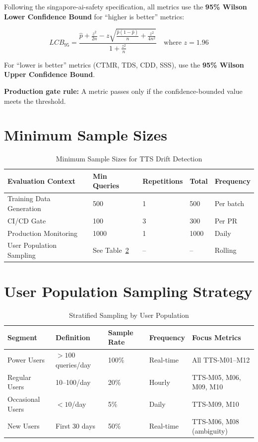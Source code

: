 Following the singapore-ai-safety specification, all metrics use the
\textbf{95\% Wilson Lower Confidence Bound} for ``higher is better'' metrics:

\begin{equation}
\boxed{
LCB_{95} = \frac{\hat{p} + \frac{z^2}{2n} - z\sqrt{\frac{\hat{p}(1-\hat{p})}{n} + \frac{z^2}{4n^2}}}{1 + \frac{z^2}{n}}
\quad \text{where } z = 1.96
}
\end{equation}

For ``lower is better'' metrics (CTMR, TDS, CDD, SSS), use the
\textbf{95\% Wilson Upper Confidence Bound}.

\textbf{Production gate rule:} A metric passes only if the confidence-bounded
value meets the threshold.

\section{Minimum Sample Sizes}

\begin{table}[htbp]
\centering
\caption{Minimum Sample Sizes for TTS Drift Detection}
\label{tab:tts-sample-sizes}
\begin{tabular}{l l l l l}
\toprule
\textbf{Evaluation Context} & \textbf{Min Queries} & \textbf{Repetitions} & \textbf{Total} & \textbf{Frequency} \\
\midrule
Training Data Generation & 500 & 1 & 500 & Per batch \\
CI/CD Gate & 100 & 3 & 300 & Per PR \\
Production Monitoring & 1000 & 1 & 1000 & Daily \\
User Population Sampling & See Table~\ref{tab:user-sampling} & -- & -- & Rolling \\
\bottomrule
\end{tabular}
\end{table}

\section{User Population Sampling Strategy}

\begin{table}[htbp]
\centering
\caption{Stratified Sampling by User Population}
\label{tab:user-sampling}
\begin{tabularx}{\textwidth}{@{}l l l l X@{}}
\toprule
\textbf{Segment} & \textbf{Definition} & \textbf{Sample Rate} & \textbf{Frequency} & \textbf{Focus Metrics} \\
\midrule
Power Users & $>100$ queries/day & 100\% & Real-time & All TTS-M01--M12 \\
Regular Users & 10--100/day & 20\% & Hourly & TTS-M05, M06, M09, M10 \\
Occasional Users & $<10$/day & 5\% & Daily & TTS-M09, M10 \\
New Users & First 30 days & 50\% & Real-time & TTS-M06, M08 (ambiguity) \\
\bottomrule
\end{tabularx}
\end{table}

